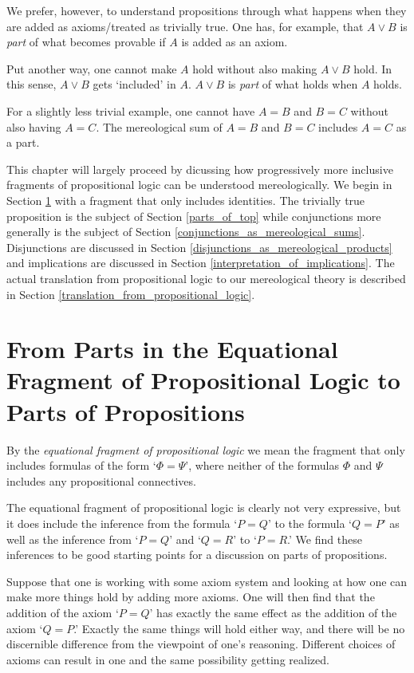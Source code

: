 \documentclass[12pt]{book}
\begin{document}
We prefer, however, to understand propositions through what happens when they are added as axioms/treated as trivially true. One has, for example, that $A \vee B$ is \textit{part} of what becomes provable if $A$ is added as an axiom.

Put another way, one cannot make $A$ hold without also making $A \vee B$ hold. In this sense, $A \vee B$ gets ‘included’ in $A$. $A \vee B$ is \textit{part} of what holds when $A$ holds.

For a slightly less trivial example, one cannot have $A = B$ and $B = C$ without also having $A = C$. The mereological sum of $A = B$ and $B = C$ includes $A = C$ as a part.

This chapter will largely proceed by dicussing how progressively more inclusive fragments of propositional logic can be understood mereologically. We begin in Section \ref{equational_fragment_of_propositional_logic} with a fragment that only includes identities. The trivially true proposition is the subject of Section \ref{parts_of_top} while conjunctions more generally is the subject of Section \ref{conjunctions_as_mereological_sums}. Disjunctions are discussed in Section \ref{disjunctions_as_mereological_products} and implications are discussed in Section \ref{interpretation_of_implications}. The actual translation from propositional logic to our mereological theory is described in Section \ref{translation_from_propositional_logic}.

\section{From Parts in the Equational Fragment of Propositional Logic to Parts of Propositions} \label{equational_fragment_of_propositional_logic}
By the \textit{equational fragment of propositional logic} we mean the fragment that only includes formulas of the form `$\Phi = \Psi$', where neither of the formulas $\Phi$ and $\Psi$ includes any propositional connectives.

The equational fragment of propositional logic is clearly not very expressive, but it does include the inference from the formula `$P = Q$' to the formula `$Q = P$' as well as the inference from `$P = Q$' and `$Q = R$' to `$P = R$.' We find these inferences to be good starting points for a discussion on parts of propositions.

Suppose that one is working with some axiom system and looking at how one can make more things hold by adding more axioms. One will then find that the addition of the axiom `$P = Q$' has exactly the same effect as the addition of the axiom `$Q = P$.' Exactly the same things will hold either way, and there will be no discernible difference from the viewpoint of one's reasoning. Different choices of axioms can result in one and the same possibility getting realized.
\end{document}
